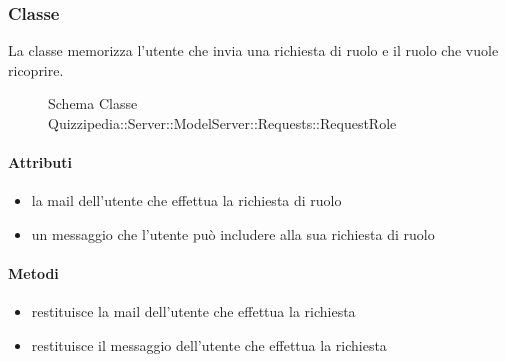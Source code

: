 \subsubsection{Classe }
La classe memorizza l'utente che invia una richiesta di ruolo e il ruolo che vuole ricoprire.
\begin{figure}[H]
\centering
\noindent{}
\caption[Schema Classe RequestRole]{Schema Classe Quizzipedia::Server::ModelServer::Requests::RequestRole}
\end{figure}
\paragraph{Attributi}
\begin{itemize}
\item {}
\newline
la mail dell'utente che effettua la richiesta di ruolo
\item {}
\newline
un messaggio che l'utente può includere alla sua richiesta di ruolo
\end{itemize}
\paragraph{Metodi}
\begin{itemize}
\item {}
\newline
restituisce la mail dell'utente che effettua la richiesta
\newline
\item {}
\newline
restituisce il messaggio dell'utente che effettua la richiesta
\newline
\end{itemize}
